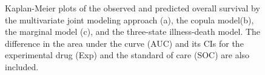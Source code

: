 \begin{figure}[H]
    \centering
    \hfill
    \caption{Kaplan-Meier plots of the observed and predicted overall survival by the multivariate joint modeling approach (a), the copula model(b), the marginal model (c), and the three-state illness-death model. The difference in the area under the curve (AUC) and its CIs for the experimental drug (Exp) and the standard of care (SOC) are also included.}
    \label{fig:predictionKM}
\end{figure}


